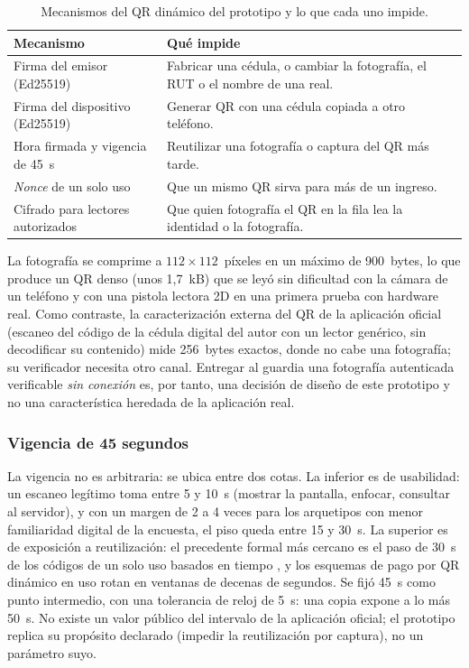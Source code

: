 \begin{table}[htbp]
  \centering
  \small
  \begin{tabular}{p{4.2cm}p{9.3cm}}
    \toprule
    Mecanismo & Qué impide \\
    \midrule
    Firma del emisor (Ed25519) & Fabricar una cédula, o cambiar la fotografía, el RUT o el nombre de una real. \\
    Firma del dispositivo (Ed25519) & Generar QR con una cédula copiada a otro teléfono. \\
    Hora firmada y vigencia de 45~s & Reutilizar una fotografía o captura del QR más tarde. \\
    \emph{Nonce} de un solo uso & Que un mismo QR sirva para más de un ingreso. \\
    Cifrado para lectores autorizados & Que quien fotografía el QR en la fila lea la identidad o la fotografía. \\
    \bottomrule
  \end{tabular}
  \caption{Mecanismos del QR dinámico del prototipo y lo que cada uno impide.}
  \label{tab:prototipo-qr}
\end{table}

La fotografía se comprime a $112\times112$~píxeles en un máximo de 900~bytes, lo que produce un
QR denso (unos 1{,}7~kB) que se leyó sin dificultad con la cámara de un teléfono y con una pistola
lectora 2D en una primera prueba con hardware real. Como contraste, la caracterización externa del
QR de la aplicación oficial (escaneo del código de la cédula digital del autor con un lector
genérico, sin decodificar su contenido) mide 256~bytes exactos, donde no cabe una fotografía; su
verificador necesita otro canal. Entregar al guardia una fotografía autenticada verificable
\emph{sin conexión} es, por tanto, una decisión de diseño de este prototipo y no una
característica heredada de la aplicación real. %

\subsubsection{Vigencia de 45 segundos}
\label{sec:prototipo-ttl}

La vigencia no es arbitraria: se ubica entre dos cotas. La inferior es de usabilidad: un escaneo
legítimo toma entre 5 y 10~s (mostrar la pantalla, enfocar, consultar al servidor), y con un
margen de 2 a 4 veces para los arquetipos con menor familiaridad digital de la encuesta, el piso
queda entre 15 y 30~s. La superior es de exposición a reutilización: el precedente formal más
cercano es el paso de 30~s de los códigos de un solo uso basados en tiempo \cite{PENDIENTE-rfc6238},
y los esquemas de pago por QR dinámico en uso rotan en ventanas de decenas de segundos. Se fijó
45~s como punto intermedio, con una tolerancia de reloj de 5~s: una copia expone a lo más 50~s.
No existe un valor público del intervalo de la aplicación oficial; el prototipo replica su
propósito declarado (impedir la reutilización por captura), no un parámetro suyo.

